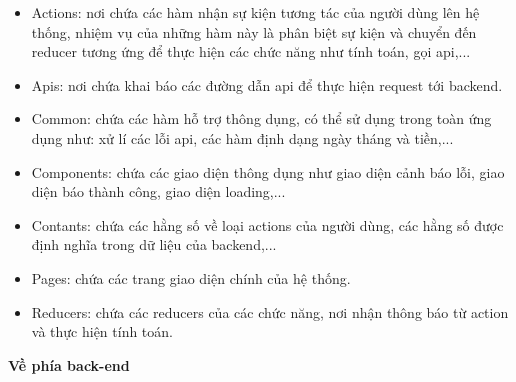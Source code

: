 \begin{itemize}
    \item Actions: nơi chứa các hàm nhận sự kiện tương tác của người dùng lên hệ thống, nhiệm vụ của những hàm này là phân biệt sự kiện và chuyển đến reducer tương ứng để thực hiện các chức năng như tính toán, gọi api,...
    \item Apis: nơi chứa khai báo các đường dẫn api để thực hiện request tới backend.
    \item Common: chứa các hàm hỗ trợ thông dụng, có thể sử dụng trong toàn ứng dụng như: xử lí các lỗi api, các hàm định dạng ngày tháng và tiền,...
    \item Components: chứa các giao diện thông dụng như giao diện cảnh báo lỗi, giao diện báo thành công, giao diện loading,...
    \item Contants: chứa các hằng số về loại actions của người dùng, các hằng số được định nghĩa trong dữ liệu của backend,...
    \item Pages: chứa các trang giao diện chính của hệ thống.
    \item Reducers: chứa các reducers của các chức năng, nơi nhận thông báo từ action và thực hiện tính toán.
\end{itemize}





\textbf{Về phía back-end}